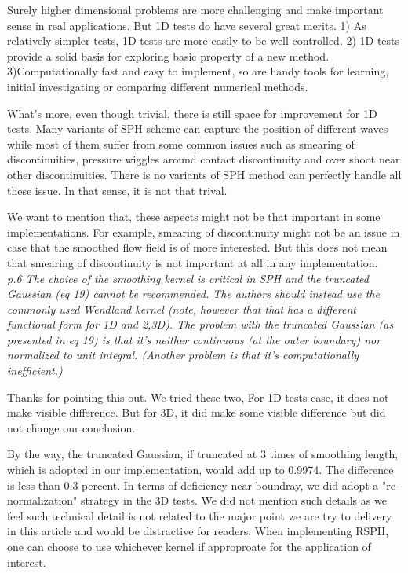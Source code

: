\documentclass[10pt,a4paper]{article}
\begin{document}
Surely higher dimensional problems are more challenging and make important sense in real applications. 
But 1D tests do have several great merits. 1) As relatively simpler tests, 1D tests are more easily to be well controlled. 2) 1D tests provide a solid basis for exploring basic property of a new method. 3)Computationally fast and easy to implement, so are handy tools for learning, initial investigating or comparing different numerical methods. 

What's more, even though trivial, there is still space for improvement for 1D tests. Many variants of SPH scheme can capture the position of different waves while most of them suffer from some common issues such as smearing of discontinuities, pressure wiggles around contact discontinuity and over shoot near other discontinuities. There is no variants of SPH method can perfectly handle all these issue. In that sense, it is not that trival.

We want to mention that, these aspects might not be that important in some implementations. For example, smearing of discontinuity might not be an issue in case that the smoothed flow field is of more interested. But this does not mean that smearing of discontinuity is not important at all in any implementation.
\\[3pt]

\textit{p.6 The choice of the smoothing kernel is critical in SPH and the truncated Gaussian (eq 19) cannot be recommended. The authors should instead use the commonly used Wendland kernel (note, however that that has a different functional form for 1D and 2,3D). The problem with the truncated Gaussian (as presented in eq 19) is that it's neither continuous (at the outer boundary) nor normalized to unit integral. (Another problem is that it's computationally inefficient.)}

Thanks for pointing this out. We tried these two, For 1D tests case, it does not make visible difference. But for 3D, it did make some visible difference but did not change our conclusion.

By the way, the truncated Gaussian, if truncated at 3 times of smoothing length, which is adopted in our implementation, would add up to 0.9974. The difference is less than 0.3 percent. 
In terms of deficiency near boundray, we did adopt a "re-normalization" strategy in the 3D tests. We did not mention such details as we feel such technical detail is not related to the major point we are try to delivery in this article and would be distractive for readers. 
When implementing RSPH, one can choose to use whichever kernel if approproate for the application of interest.
\\[3pt]
\end{document}
